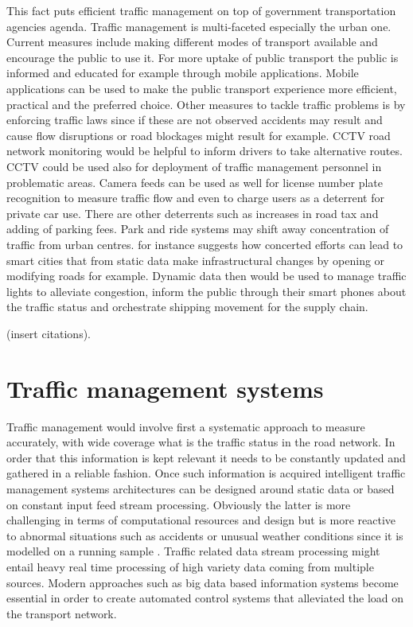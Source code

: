 \documentclass[12pt, a4paper]{report}
\theoremstyle{definition}
\theoremstyle{definition}%
\theoremstyle{definition}%
\theoremstyle{definition}%
\theoremstyle{definition}%
\theoremstyle{definition}%
\begin{document}
This fact puts efficient traffic management on top of government transportation agencies agenda.
Traffic management is multi-faceted especially the urban one. Current measures include making different modes of transport available and encourage the public to use it. For more uptake of public transport the public is informed and educated for example through mobile applications.  Mobile applications can be used to make the public transport experience more efficient, practical and the preferred choice. Other measures to tackle traffic problems is by enforcing traffic laws since if these are not observed accidents may result and cause flow disruptions or road blockages might result for example. CCTV road network monitoring would be helpful to inform drivers to take alternative routes. CCTV could be used also for deployment of traffic management personnel in problematic areas. Camera feeds can be used as well for license number plate recognition to measure traffic flow and even to charge users as a deterrent for private car use. There are other deterrents such as increases in road tax and adding of parking fees. Park and ride systems may shift away concentration of traffic from urban centres.  \cite{AlNuaimi2015} for instance suggests how concerted efforts can lead to smart cities that from static data make infrastructural changes by opening or modifying roads for example. Dynamic data  then would be used to manage traffic lights to alleviate congestion, inform the public through their smart phones about the traffic status and orchestrate shipping movement for the supply chain.

(insert citations). 


\section{Traffic management systems}

Traffic management would involve first a systematic approach to measure accurately, with wide coverage what is the traffic status in the road network. In order that this information is kept relevant it needs to be constantly updated and gathered in a reliable fashion. Once such information is acquired intelligent traffic management systems architectures can be designed around static data or based  on constant input feed stream processing. Obviously the latter is more challenging in terms of computational resources and design but is more reactive to abnormal situations such as accidents or unusual weather conditions since it is modelled on a running sample \cite{Toole2015}. Traffic related data stream processing might entail heavy real time processing of high variety data coming from multiple sources. Modern approaches such as big data based information systems become essential in order to create automated control systems that alleviated the load on the transport network.
\end{document}
